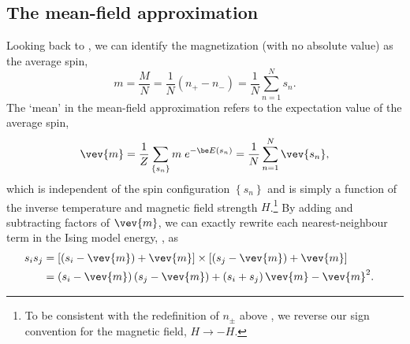 \subsection{\label{sec:mean_field}The mean-field approximation}
Looking back to , we can identify the magnetization (with no absolute value) as the average spin,
\begin{equation*}
  m = \frac{M}{N} = \frac{1}{N}\left(n_+ - n_-\right) = \frac{1}{N} \sum_{n = 1}^N s_n.
\end{equation*}
The `mean' in the mean-field approximation refers to the expectation value of the average spin,
\begin{equation*}
  \vev{m} = \frac{1}{Z} \sum_{\left\{s_n\right\}} m \; e^{-\be E(s_n)} = \frac{1}{N} \sum_{n = 1}^N \vev{s_n},
\end{equation*}
which is independent of the spin configuration $\left\{s_n\right\}$ and is simply a function of the inverse temperature \be and magnetic field strength $H$.\footnote{To be consistent with the redefinition of $n_{\pm}$ above , we reverse our sign convention for the magnetic field, $H \to -H$.}
By adding and subtracting factors of $\vev{m}$, we can exactly rewrite each nearest-neighbour term in the Ising model energy, , as
\begin{align}
  s_i s_j & = \left[\left(s_i - \vev{m}\right) + \vev{m}\right] \times \left[\left(s_j - \vev{m}\right) + \vev{m}\right] \cr
          & = \left(s_i - \vev{m}\right) \left(s_j - \vev{m}\right) + \left(s_i + s_j\right)\vev{m} - \vev{m}^2. \label{eq:MF_start}
\end{align}

